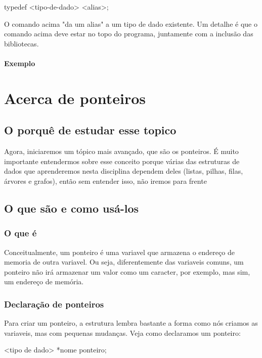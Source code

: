 \documentclass{report}
\begin{document}
	\begin{LARGE}
		\begin{center}
			typedef <tipo-de-dado> <alias>;
		\end{center}
	\end{LARGE}
	
	O comando acima "da um alias" a um tipo de dado existente. Um detalhe é que o comando acima deve estar no topo do programa, juntamente com a inclusão das bibliotecas.
	
	\subsubsection{Exemplo}
	
	\chapter{Acerca de ponteiros}
	\section{O porquê de estudar esse topico}
	Agora, iniciaremos um tópico mais avançado, que são os ponteiros. É muito importante entendermos sobre esse conceito porque várias das estruturas de dados que aprenderemos nesta disciplina dependem deles (listas, pilhas, filas, árvores e grafos), então sem entender isso, não iremos para frente
	\section{O que são e como usá-los}
	\subsection{O que é}
	Conceitualmente, um ponteiro é uma variavel que armazena o endereço de memoria de outra variavel. Ou seja, diferentemente das variaveis comuns, um ponteiro não irá armazenar um valor como um caracter, por exemplo, mas sim, um endereço de memória.	
	\subsection{Declaração de ponteiros}
	Para criar um ponteiro, a estrutura lembra bastante a forma como nós criamos as variaveis, mas com pequenas mudanças. Veja como declaramos um ponteiro:
	
	\begin{LARGE}
		\begin{center}
			<tipo de dado> *nome ponteiro;
		\end{center}
	\end{LARGE}
	
\end{document}
